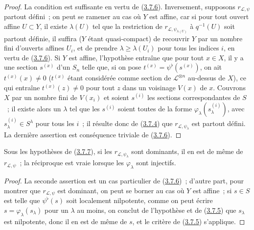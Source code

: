 \begin{proof}
La condition est suffisante en vertu de
(\hyperref[II.3.7.6-fr]{3.7.6}). Inversement, supposons
$r_{\mathcal{L},\psi}$ partout défini~; on peut se ramener au cas où $Y$ est
affine, car si pour tout ouvert affine $U\subset Y$, il existe $\lambda(U)$
tel que la restriction de $r_{\mathcal{L},\psi_{\lambda(U)}}$ à $q^{-1}(U)$
soit partout définie, il suffira ($Y$ étant quasi-compact) de recouvrir $Y$
par un nombre fini d'ouverts affines $U_i$, et de prendre
$\lambda\geq\lambda(U_i)$ pour tous les indices $i$, en vertu de
(\hyperref[II.3.7.6-fr]{3.7.6}). Si $Y$ est affine, l'hypothèse entraîne que
pour tout $x\in X$, il y a une section $s^{(x)}$ d'un $S_n$ telle que, si on
pose $t^{(x)}=\psi^\flat(s^{(x)})$, on ait $t^{(x)}(x)\neq0$
($t^{(x)}$ étant considérée comme section de $\mathcal{L}^{\otimes n}$
au-dessus de $X$), ce qui entraîne $t^{(x)}(z)\neq0$ pour tout $z$ dans un
voisinage $V(x)$ de $x$. Couvrons $X$ par un nombre fini de $V(x_i)$ et
soient $s^{(i)}$ les sections correspondantes de $S$~; il existe alors un
$\lambda$ tel que les $s^{(i)}$ soient toutes de la forme
$\varphi_\lambda(s_\lambda^{(i)})$, avec $s_\lambda^{(i)}\in S^\lambda$ pour
tous les $i$~; il résulte donc de (\hyperref[II.3.7.4-fr]{3.7.4}) que
$r_{\mathcal{L},\psi_\lambda}$ est partout défini. La dernière assertion est
conséquence triviale de (\hyperref[II.3.7.6-fr]{3.7.6}).
\end{proof}

\begin{corollary}[3.7.8]
\label{II.3.7.8-fr}
Sous les hypothèses de (\hyperref[II.3.7.7-fr]{3.7.7}), si les
$r_{\mathcal{L},\psi_\lambda}$ sont dominants, il en est de même de
$r_{\mathcal{L},\psi}$~; la réciproque est vraie lorsque les
$\varphi_\lambda$ sont injectifs.
\end{corollary}


\begin{proof}
La seconde assertion est un cas particulier de
(\hyperref[II.3.7.6-fr]{3.7.6})~; d'autre part, pour montrer que
$r_{\mathcal{L},\psi}$ est dominant, on peut se borner au cas où $Y$ est
affine~; si $s\in S$ est telle que $\psi^\flat(s)$ soit localement
nilpotente, comme on peut écrire $s=\varphi_\lambda(s_\lambda)$ pour un
$\lambda$ au moins, on conclut de l'hypothèse et de
(\hyperref[II.3.7.5-fr]{3.7.5}) que $s_\lambda$ est nilpotente, donc il en est
de même de $s$, et le critère de (\hyperref[II.3.7.5-fr]{3.7.5}) s'applique.
\end{proof}


